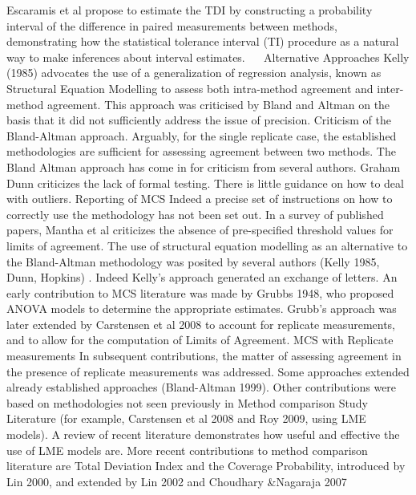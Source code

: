 Escaramis et al propose to estimate the TDI by constructing a probability interval of the difference in paired measurements between methods, demonstrating how the statistical tolerance interval (TI) procedure as a natural way to make inferences about interval estimates.  
Alternative Approaches
Kelly (1985) advocates the use of a generalization of regression analysis, known as Structural Equation Modelling to assess both intra-method agreement and inter-method agreement. This approach was criticised by Bland and Altman on the basis that it did not sufficiently address the issue of precision.
Criticism of the Bland-Altman approach.
Arguably, for the single replicate case, the established methodologies are sufficient for assessing agreement between two methods.
The Bland Altman approach has come in for criticism from several authors.  Graham Dunn criticizes the lack of formal testing.  There is little guidance on how to deal with outliers.
Reporting of MCS
Indeed a precise set of instructions on how to correctly use the methodology has not been set out. In a survey of published papers, Mantha et al criticizes the absence of pre-specified threshold values for limits of agreement.
The use of structural equation modelling as an alternative to the Bland-Altman methodology was posited by several authors (Kelly 1985, Dunn, Hopkins) . Indeed Kelly’s approach generated an exchange of letters.                                                
An early contribution to MCS literature was made by Grubbs 1948, who proposed ANOVA models to determine the appropriate estimates. Grubb’s approach was later extended by Carstensen et al 2008 to account for replicate measurements, and to allow for the computation of Limits of Agreement.
MCS with Replicate measurements
In subsequent contributions, the matter of assessing agreement in the presence  of replicate measurements was addressed. Some approaches extended already established approaches (Bland-Altman 1999).  Other contributions were based on methodologies not seen previously in Method comparison Study Literature  (for example, Carstensen et al 2008 and Roy 2009, using LME models). 
A review of recent literature demonstrates how useful and effective the use of LME models are.
More recent contributions to method comparison literature are Total Deviation Index and the Coverage Probability, introduced by Lin 2000, and extended by Lin 2002 and Choudhary &Nagaraja 2007


